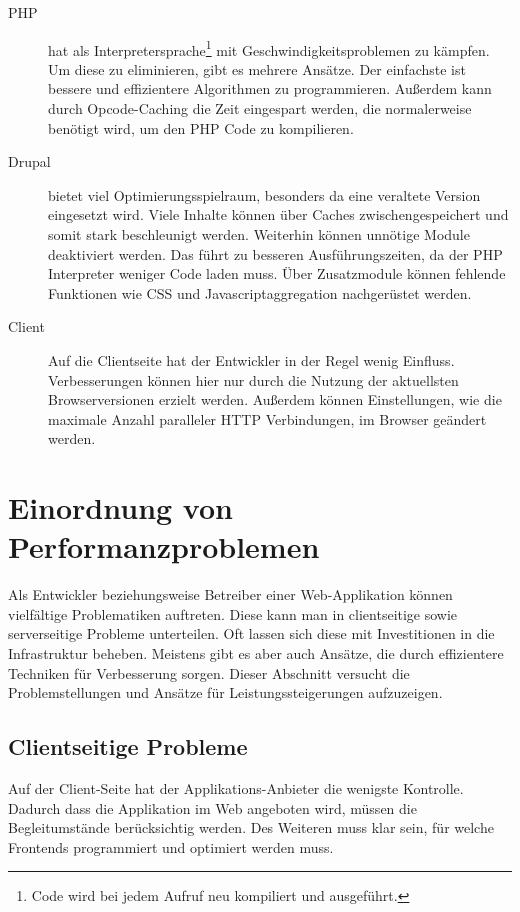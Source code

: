 \begin{description}
  \item[PHP] hat als Interpretersprache\footnote{Code wird bei jedem Aufruf neu kompiliert und ausgef\"uhrt.} mit Geschwindigkeitsproblemen zu k\"ampfen. Um diese zu eliminieren, gibt es mehrere Ans\"atze. Der einfachste ist bessere und effizientere Algorithmen zu programmieren. Au\ss{}erdem kann durch Opcode-Caching die Zeit eingespart werden, die normalerweise ben\"otigt wird, um den PHP Code zu kompilieren. 
  \item[Drupal] bietet viel Optimierungsspielraum, besonders da eine veraltete Version eingesetzt wird. Viele Inhalte k\"onnen \"uber Caches zwischengespeichert und somit stark beschleunigt werden. Weiterhin k\"onnen unn\"otige Module deaktiviert werden. Das f\"uhrt zu besseren Ausf\"uhrungszeiten, da der PHP Interpreter weniger Code laden muss. \"Uber Zusatzmodule k\"onnen fehlende Funktionen wie CSS und Javascriptaggregation nachger\"ustet werden.
  \item[Client] Auf die Clientseite hat der Entwickler in der Regel wenig Einfluss. Verbesserungen k\"onnen hier nur durch die Nutzung der aktuellsten Browserversionen erzielt werden. Au\ss{}erdem k\"onnen Einstellungen, wie die maximale Anzahl paralleler HTTP Verbindungen, im Browser ge\"andert werden.
\end{description}

\section{Einordnung von Performanzproblemen}
Als Entwickler beziehungsweise Betreiber einer Web-Applikation k\"onnen vielf\"altige Problematiken auftreten. Diese kann man in clientseitige sowie serverseitige Probleme unterteilen. Oft lassen sich diese mit Investitionen in die Infrastruktur beheben. Meistens gibt es aber auch Ans\"atze, die durch effizientere Techniken f\"ur Verbesserung sorgen. Dieser Abschnitt versucht die Problemstellungen und Ans\"atze f\"ur Leistungssteigerungen aufzuzeigen.
\subsection{Clientseitige Probleme}
Auf der Client-Seite hat der Applikations-Anbieter die wenigste Kontrolle. Dadurch dass die Applikation im Web angeboten wird, m\"ussen die Begleitumst\"ande ber\"ucksichtig werden. Des Weiteren muss klar sein, f\"ur welche Frontends programmiert und optimiert werden muss.  
